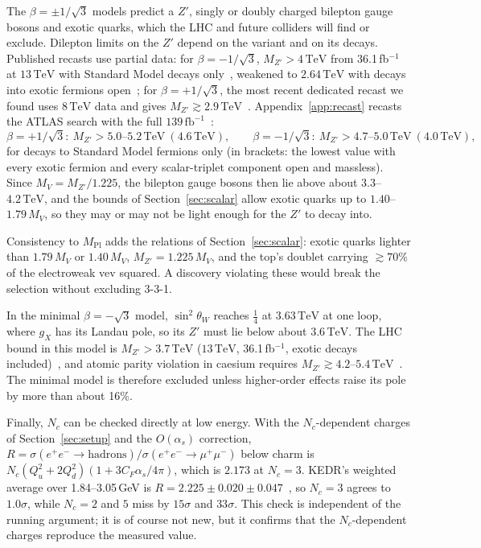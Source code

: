 \documentclass[11pt,a4paper]{article}
\newcommand{\Nc}{N_c}
\newcommand{\MPl}{M_{\mathrm{Pl}}}
\newcommand{\sw}{\sin^2\theta_W}
\newcommand{\TeV}{\,\mathrm{TeV}}
\begin{document}
The $\beta=\pm1/\sqrt3$ models predict a $Z'$, singly or doubly charged bilepton gauge
bosons and exotic quarks, which the LHC and future colliders will find or exclude.
Dilepton limits on the $Z'$ depend on the variant and on its decays. Published recasts
use partial data: for $\beta=-1/\sqrt3$, $M_{Z'}>4\TeV$ from 36.1\,fb$^{-1}$ at
$13\TeV$ with Standard Model decays only~\cite{Lindner:2016bgg}, weakened to $2.64\TeV$
with decays into exotic fermions open~\cite{deJesus:2020ngn}; for $\beta=+1/\sqrt3$, the
most recent dedicated recast we found uses $8\TeV$ data and gives
$M_{Z'}\gtrsim2.9\TeV$~\cite{Salazar:2015gxa}. Appendix~\ref{app:recast} recasts the ATLAS
search with the full $139\,\text{fb}^{-1}$~\cite{ATLAS:2019erb}:
\begin{equation*}
\beta=+1/\sqrt3:\ M_{Z'}>5.0\text{--}5.2\TeV\ (4.6\TeV),\qquad
\beta=-1/\sqrt3:\ M_{Z'}>4.7\text{--}5.0\TeV\ (4.0\TeV),
\end{equation*}
for decays to Standard Model fermions only (in brackets: the lowest value with every exotic
fermion and every scalar-triplet component open and massless). Since $M_V=M_{Z'}/1.225$, the bilepton gauge bosons then lie above about
$3.3$--$4.2\TeV$, and the bounds of Section~\ref{sec:scalar} allow exotic quarks up to
$1.40$--$1.79\,M_V$, so they may or may not be light enough for the $Z'$ to decay into.

Consistency to $\MPl$ adds the relations of Section~\ref{sec:scalar}: exotic quarks
lighter than $1.79\,M_V$ or $1.40\,M_V$, $M_{Z'}=1.225\,M_V$, and the top's doublet
carrying $\gtrsim70\%$ of the electroweak vev squared. A discovery violating these would
break the selection without excluding 3-3-1.

In the minimal $\beta=-\sqrt3$ model, $\sw$ reaches $\tfrac14$ at $3.63\TeV$ at one loop,
where $g_X$ has its Landau pole, so its $Z'$ must lie below about $3.6\TeV$. The LHC
bound in this model is $M_{Z'}>3.7\TeV$ ($13\TeV$, 36.1\,fb$^{-1}$, exotic decays
included)~\cite{Nepomuceno:2019eaz}, and atomic parity violation in caesium requires
$M_{Z'}\gtrsim4.2$--$5.4\TeV$~\cite{Long:2018fud}. The minimal model is therefore excluded
unless higher-order effects raise its pole by more than about 16\%.

Finally, $\Nc$ can be checked directly at low energy. With the $\Nc$-dependent charges of
Section~\ref{sec:setup} and the $O(\alpha_s)$ correction, $R=\sigma(e^+e^-\to
\text{hadrons})/\sigma(e^+e^-\to\mu^+\mu^-)$ below charm is
$\Nc(Q_u^2+2Q_d^2)(1+3C_F\alpha_s/4\pi)$, which is $2.173$ at $\Nc=3$. KEDR's weighted
average over 1.84--3.05\,GeV is $R=2.225\pm0.020\pm0.047$~\cite{KEDR:2016hjj}, so $\Nc=3$
agrees to $1.0\sigma$, while $\Nc=2$ and $5$ miss by $15\sigma$ and $33\sigma$. This check
is independent of the running argument; it is of course not new, but it confirms that the
$\Nc$-dependent charges reproduce the measured value.
\end{document}

